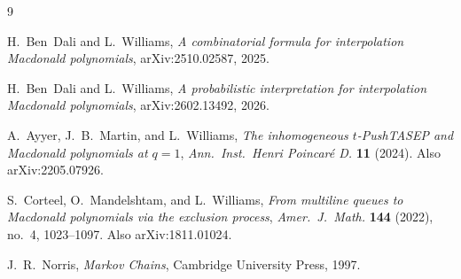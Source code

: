 \documentclass[12pt]{article}
\theoremstyle{definition}
\begin{document}
\begin{thebibliography}{9}

H.~Ben~Dali and L.~Williams,
\emph{A combinatorial formula for interpolation Macdonald polynomials},
arXiv:2510.02587, 2025.

H.~Ben~Dali and L.~Williams,
\emph{A probabilistic interpretation for interpolation Macdonald polynomials},
arXiv:2602.13492, 2026.

A.~Ayyer, J.~B.~Martin, and L.~Williams,
\emph{The inhomogeneous $t$-PushTASEP and Macdonald polynomials at $q=1$},
\emph{Ann.\ Inst.\ Henri Poincar\'e D.} \textbf{11} (2024).
Also arXiv:2205.07926.

S.~Corteel, O.~Mandelshtam, and L.~Williams,
\emph{From multiline queues to Macdonald polynomials via the exclusion
process},
\emph{Amer.\ J.\ Math.} \textbf{144} (2022), no.~4, 1023--1097.
Also arXiv:1811.01024.

J.~R.~Norris,
\emph{Markov Chains},
Cambridge University Press, 1997.

\end{thebibliography}
\end{document}
